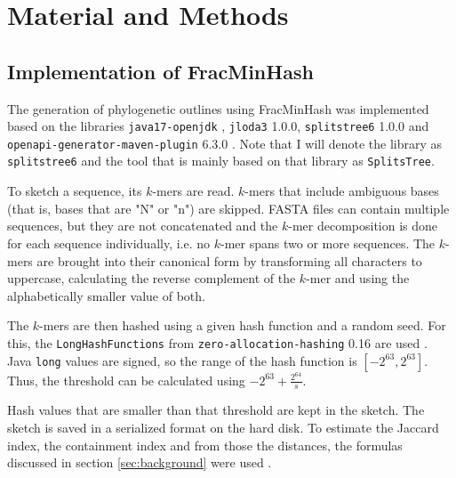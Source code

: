 
\chapter{Material and Methods}
  \label{sec:matmet}

\section{Implementation of FracMinHash}
The generation of phylogenetic outlines using FracMinHash was implemented based
on the libraries \texttt{java17-openjdk} \cite{theopenjdkcommunityJDK172021},
\texttt{jloda3} 1.0.0, \texttt{splitstree6} 1.0.0
\cite{husonApplicationPhylogeneticNetworks2006} and
\texttt{openapi-generator-maven-plugin} 6.3.0
\cite{openapi-generatorcontributorsOpenAPIGenerator2023}. Note that I will
denote the library as \texttt{splitstree6} and the tool that is mainly based on
that library as \texttt{SplitsTree}.

To sketch a sequence, its $k$-mers are read. $k$-mers that include ambiguous
bases (that is, bases that are "N" or "n") are skipped. FASTA files can contain
multiple sequences, but they are not concatenated and the $k$-mer decomposition
is done for each sequence individually, i.e. no $k$-mer spans two or more
sequences. The $k$-mers are brought into their canonical form
\cite{ondovMashFastGenome2016,irberLightweightCompositionalAnalysis2022} by
transforming all characters to uppercase, calculating the reverse complement of
the $k$-mer and using the alphabetically smaller value of both.

The $k$-mers are then hashed using a given hash function and a random seed. For
this, the \texttt{LongHashFunctions} from \texttt{zero-allocation-hashing} 0.16
are used \cite{ZeroAllocationHashing2022}. Java \texttt{long} values are signed,
so the range of the hash function is $[-2^{63}, 2^{63}]$. Thus, the threshold
can be calculated using $-2^{63} + \frac{2^{64}}{s}$. 

Hash values that are smaller than that threshold are kept in the sketch. The
sketch is saved in a serialized format on the hard disk. To estimate the Jaccard
index, the containment index and from those the distances, the formulas
discussed in section \ref{sec:background} were used
\cite{heraDerivingConfidenceIntervals2023,irberLightweightCompositionalAnalysis2022}.

